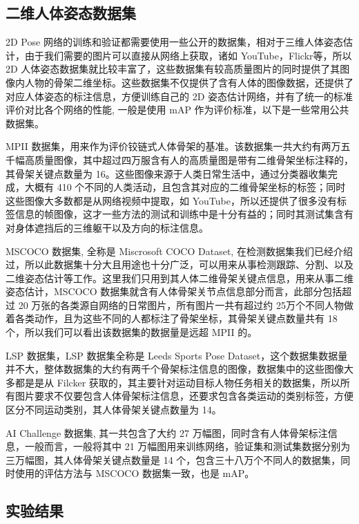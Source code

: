 \subsection{二维人体姿态数据集}{}

2D Pose 网络的训练和验证都需要使用一些公开的数据集，相对于三维人体姿态估计，由于我们需要的图片可以直接从网络上获取，诸如 YouTube，Flickr等，所以 2D 人体姿态数据集就比较丰富了，这些数据集有较高质量图片的同时提供了其图像内人物的骨架二维坐标。这些数据集不仅提供了含有人体的图像数据，还提供了对应人体姿态的标注信息，方便训练自己的 2D 姿态估计网络，并有了统一的标准评价对比各个网络的性能, 一般是使用 mAP 作为评价标准，以下是一些常用公共数据集。

MPII 数据集，用来作为评价铰链式人体骨架的基准。该数据集一共大约有两万五千幅高质量图像，其中超过四万服含有人的高质量图是带有二维骨架坐标注释的，其骨架关键点数量为 16。这些图像来源于人类日常生活中，通过分类器收集完成，大概有 410 个不同的人类活动，且包含其对应的二维骨架坐标的标签；同时这些图像大多数都是从网络视频中提取，如 YouTube，所以还提供了很多没有标签信息的帧图像，这才一些方法的测试和训练中是十分有益的；同时其测试集含有对身体遮挡后的三维躯干以及方向的标注信息。

MSCOCO 数据集, 全称是 Miscrosoft COCO Dataset, 在检测数据集我们已经介绍过，所以此数据集十分大且用途也十分广泛，可以用来从事检测跟踪、分割、以及二维姿态估计等工作。这里我们只用到其人体二维骨架关键点信息，用来从事二维姿态估计，MSCOCO 数据集就含有人体骨架关节点信息部分而言，此部分包括超过 20 万张的各类源自网络的日常图片，所有图片一共有超过约 25万个不同人物做着各类动作，且为这些不同的人都标注了骨架坐标，其骨架关键点数量共有 18 个，所以我们可以看出该数据集的数据量是远超 MPII 的。

LSP 数据集，LSP 数据集全称是 Leeds Sports Pose Dataset，这个数据集数据量并不大，整体数据集的大约有两千个骨架标注信息的图像，数据集中的这些图像大多都是是从 Filcker 获取的，其主要针对运动目标人物任务相关的数据集，所以所有图片要求不仅要包含人体骨架标注信息，还要求包含各类运动的类别标签，方便区分不同运动类别，其人体骨架关键点数量为 14。

AI Challenge 数据集, 其一共包含了大约 27 万幅图，同时含有人体骨架标注信息，一般而言，一般将其中 21 万幅图用来训练网络，验证集和测试集数据分别为三万幅图，其人体骨架关键点数量是 14 个，包含三十八万个不同人的数据集，同时使用的评估方法与 MSCOCO 数据集一致，也是 mAP。


\subsection{实验结果}{}


